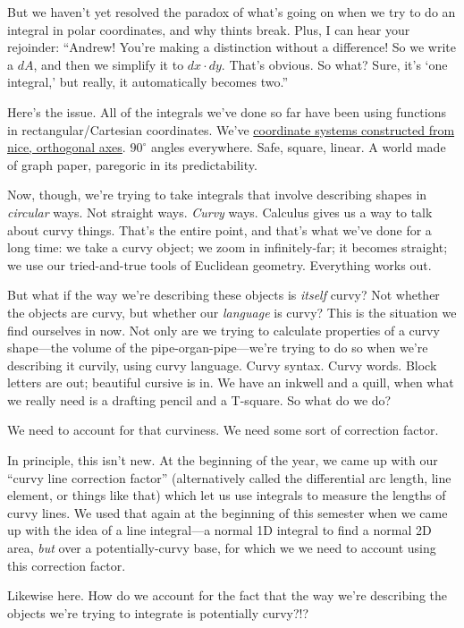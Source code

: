 \documentclass[
]{article}
\begin{document}
But we haven't yet resolved the paradox of what's going on when we try to do an integral in polar coordinates, and why thints break. Plus, I can hear your rejoinder: ``Andrew! You're making a distinction without a difference! So we write a \(dA\), and then we simplify it to \(dx\cdot dy\). That's obvious. So what? Sure, it's `one integral,' but really, it automatically becomes two.''

Here's the issue. All of the integrals we've done so far have been using functions in rectangular/Cartesian coordinates. We've \href{https://en.wikipedia.org/wiki/Orthonormal_basis}{coordinate systems constructed from nice, orthogonal axes}. \(90^\circ\) angles everywhere. Safe, square, linear. A world made of graph paper, paregoric in its predictability.

Now, though, we're trying to take integrals that involve describing shapes in \emph{circular} ways. Not straight ways. \emph{Curvy} ways. Calculus gives us a way to talk about curvy things. That's the entire point, and that's what we've done for a long time: we take a curvy object; we zoom in infinitely-far; it becomes straight; we use our tried-and-true tools of Euclidean geometry. Everything works out.

But what if the way we're describing these objects is \emph{itself} curvy? Not whether the objects are curvy, but whether our \emph{language} is curvy? This is the situation we find ourselves in now. Not only are we trying to calculate properties of a curvy shape---the volume of the pipe-organ-pipe---we're trying to do so when we're describing it curvily, using curvy language. Curvy syntax. Curvy words. Block letters are out; beautiful cursive is in. We have an inkwell and a quill, when what we really need is a drafting pencil and a T-square. So what do we do?

We need to account for that curviness. We need some sort of correction factor.

In principle, this isn't new. At the beginning of the year, we came up with our ``curvy line correction factor'' (alternatively called the differential arc length, line element, or things like that) which let us use integrals to measure the lengths of curvy lines. We used that again at the beginning of this semester when we came up with the idea of a line integral---a normal 1D integral to find a normal 2D area, \emph{but} over a potentially-curvy base, for which we we need to account using this correction factor.

Likewise here. How do we account for the fact that the way we're describing the objects we're trying to integrate is potentially curvy?!?
\end{document}
